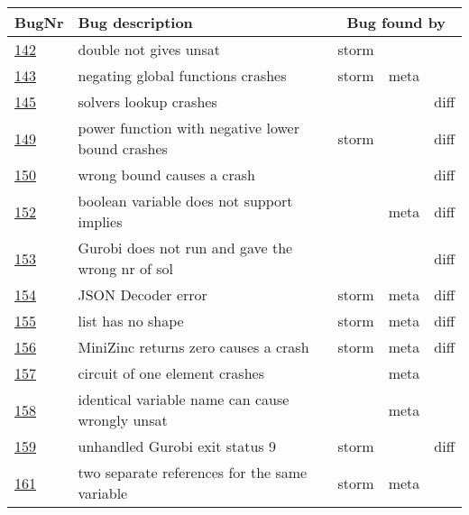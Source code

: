 \begin{table}[]
	\centering
	\begin{tabular}{lllll}
		BugNr & Bug description                                           & \multicolumn{3}{c}{\centering  Bug found by} \\ \toprule
		\href{https://github.com/CPMpy/cpmpy/issues/142}{142} & double not gives unsat                            & storm &       &      \\
		\href{https://github.com/CPMpy/cpmpy/issues/143}{143} & negating global functions crashes                 & storm & meta  &      \\
		\href{https://github.com/CPMpy/cpmpy/issues/145}{145} & solvers lookup crashes                            &       &       & diff \\
		\href{https://github.com/CPMpy/cpmpy/issues/149}{149} & power function with negative lower bound crashes  & storm &       & diff \\
		\href{https://github.com/CPMpy/cpmpy/issues/150}{150} & wrong bound causes a crash                  &       &       & diff \\
		\href{https://github.com/CPMpy/cpmpy/issues/152}{152} & boolean variable does not support implies         &       & meta  & diff \\
		\href{https://github.com/CPMpy/cpmpy/issues/153}{153} & Gurobi does not run and gave the wrong nr of sol  &       &       & diff \\
		\href{https://github.com/CPMpy/cpmpy/issues/154}{154} & JSON Decoder error                                & storm & meta  & diff \\
		\href{https://github.com/CPMpy/cpmpy/issues/155}{155} & list has no shape                                 & storm & meta  & diff \\
		\href{https://github.com/CPMpy/cpmpy/issues/156}{156} & MiniZinc returns zero causes a crash              & storm & meta  & diff \\
		\href{https://github.com/CPMpy/cpmpy/issues/157}{157} & circuit of one element crashes                    &       & meta  &      \\
		\href{https://github.com/CPMpy/cpmpy/issues/158}{158} & identical variable name can cause wrongly unsat   &       & meta  &      \\
		\href{https://github.com/CPMpy/cpmpy/issues/159}{159} & unhandled Gurobi exit status 9                    & storm &       & diff \\
		\href{https://github.com/CPMpy/cpmpy/issues/161}{161} & two separate references for the same variable     & storm & meta  &      \\

\end{tabular}
\end{table}
